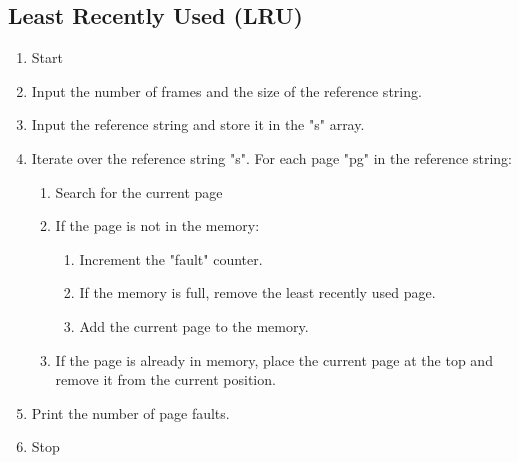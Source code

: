 \subsection{Least Recently Used (LRU)}
\begin{enumerate}
   \item Start
   \item Input the number of frames and the size of the reference string.
   \item Input the reference string and store it in the "s" array.
   \item Iterate over the reference string "s". For each page "pg" in the reference string:
   \begin{enumerate}
       \item Search for the current page
       \item If the page is not in the memory:
       \begin{enumerate}
           \item Increment the "fault" counter.
           \item If the memory is full, remove the least recently used page.
           \item Add the current page to the memory.
       \end{enumerate}
       \item If the page is already in memory, place the current page at the top and remove it from the current position.
   \end{enumerate}
   \item Print the number of page faults.
   \item Stop
\end{enumerate}

